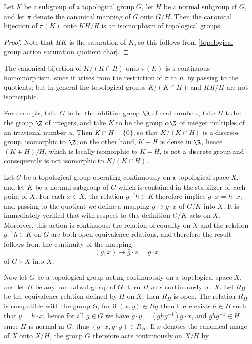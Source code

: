 \begin{proposition}\label{topological group third isomorphism thm}
Let $K$ be a subgroup of a topological group $G$, let $H$ be a normal subgroup of $G$, and let $\pi$ denote the canonical mapping of $G$ onto $G/H$. Then the canonical bijection of $\pi(K)$ onto $KH/H$ is an isomorphism of topological groups.
\end{proposition}
\begin{proof}
Note that $HK$ is the saturation of $K$, so this follows from \cref{topological group action saturation quotient char}.
\end{proof}
The canonical bijection of $K/(K\cap H)$ onto $\pi(K)$ is a continuous homomorphism, since it arises from the restriction of $\pi$ to $K$ by passing to the quotients; but in general the topological groups $K/(K\cap H)$ and $KH/H$ are not isomorphic.
\begin{example}
For example, take $G$ to be the additive group $\R$ of real numbers, take $H$ to be the group $\Z$ of integers, and take $K$ to be the group $\alpha\Z$ of integer multiples of an irrational number $\alpha$. Then $K\cap H=\{0\}$, so that $K/(K\cap H)$ is a discrete group, isomorphic to $\Z$; on the other hand, $K+H$ is dense in $\R$, hence $(K+H)/H$, which is locally isomorphic to $K+H$, is not a discrete group and consequently is not isomorphic to $K/(K\cap H)$.
\end{example}
Let $G$ be a topological group operating continuously on a topological space $X$, and let $K$ be a normal subgroup of $G$ which is contained in the stabilizer of each point of $X$. For each $x\in X$, the relation $g^{-1}h\in K$ therefore implies $g\cdot x=h\cdot x$, and passing to the quotient we define a mapping $\bar{g}\mapsto\bar{g}\cdot x$ of $G/K$ into $X$. It is immediately verified that with respect to this definition $G/K$ acts on $X$. Moreover, this action is continuous: the relation of equality on $X$ and the relation $g^{-1}h\in K$ on $G$ are both open equivalence relations, and therefore the result follows from the continuity of the mapping
\[(g,x)\mapsto\bar{g}\cdot x=g\cdot x\]
of $G\times X$ into $X$.\par
Now let $G$ be a topological group acting continuously on a topological space $X$, and let $H$ be any normal subgroup of $G$; then $H$ acts continuously on $X$. Let $R_H$ be the equivalence relation defined by $H$ on $X$; then $R_H$ is open. The relation $R_H$ is compatible with the group $G$, for if $(x,y)\in R_H$ then there exists $h\in H$ such that $y=h\cdot x$, hence for all $g\in G$ we have $g\cdot y=(ghg^{-1})g\cdot x$, and $ghg^{-1}\in H$ since $H$ is normal in $G$; thus $(g\cdot x,g\cdot y)\in R_H$. If $\bar{x}$ denotes the canonical image of $X$ onto $X/H$, the group $G$ therefore acts continuously on $X/H$ by
